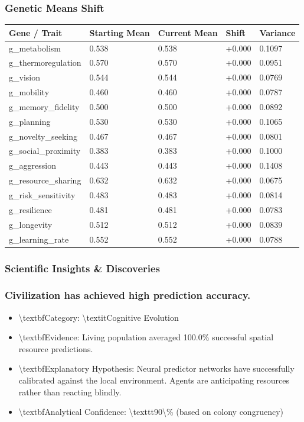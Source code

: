\documentclass[11pt,a4paper]{article}
\begin{document}
\subsubsection*{ Genetic Means Shift}
\begin{longtable}{lllll}
\toprule
Gene / Trait & Starting Mean & Current Mean & Shift & Variance \\
\midrule
\endhead
g\_metabolism & 0.538 & 0.538 & +0.000 & 0.1097 \\
g\_thermoregulation & 0.570 & 0.570 & +0.000 & 0.0951 \\
g\_vision & 0.544 & 0.544 & +0.000 & 0.0769 \\
g\_mobility & 0.460 & 0.460 & +0.000 & 0.0787 \\
g\_memory\_fidelity & 0.500 & 0.500 & +0.000 & 0.0892 \\
g\_planning & 0.530 & 0.530 & +0.000 & 0.1065 \\
g\_novelty\_seeking & 0.467 & 0.467 & +0.000 & 0.0801 \\
g\_social\_proximity & 0.383 & 0.383 & +0.000 & 0.1000 \\
g\_aggression & 0.443 & 0.443 & +0.000 & 0.1408 \\
g\_resource\_sharing & 0.632 & 0.632 & +0.000 & 0.0675 \\
g\_risk\_sensitivity & 0.483 & 0.483 & +0.000 & 0.0814 \\
g\_resilience & 0.481 & 0.481 & +0.000 & 0.0783 \\
g\_longevity & 0.512 & 0.512 & +0.000 & 0.0839 \\
g\_learning\_rate & 0.552 & 0.552 & +0.000 & 0.0788 \\
\bottomrule
\end{longtable}

\subsubsection*{ Scientific Insights \& Discoveries}
\subsubsection*{ Civilization has achieved high prediction accuracy.}
\begin{itemize}
  \item \textbackslash{}textbf{Category:} \textbackslash{}textit{Cognitive Evolution}
  \item \textbackslash{}textbf{Evidence:} Living population averaged 100.0\% successful spatial resource predictions.
  \item \textbackslash{}textbf{Explanatory Hypothesis:} Neural predictor networks have successfully calibrated against the local environment. Agents are anticipating resources rather than reacting blindly.
  \item \textbackslash{}textbf{Analytical Confidence:} \textbackslash{}texttt{90\textbackslash{}\%} (based on colony congruency)
\end{itemize}
\end{document}
